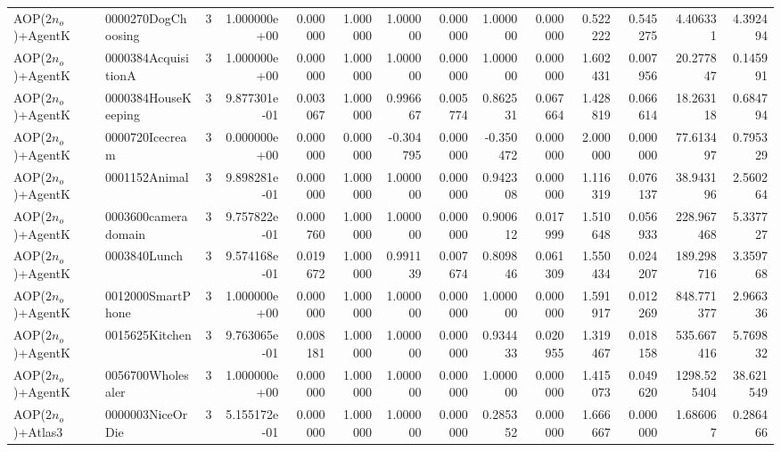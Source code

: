 \begin{tabular}{llrr|r|rr|rr|rr|rrr}
      AOP($2 n_o$)+AgentK &     0000270DogChoosing &       3 & 1.000000e+00 & 0.000000 & 1.000000 &      1.000000 & 0.000000 &      1.000000 & 0.000000 &      0.522222 &    0.545275 &     4.406331 &    4.392494 \\
      AOP($2 n_o$)+AgentK &    0000384AcquisitionA &       3 & 1.000000e+00 & 0.000000 & 1.000000 &      1.000000 & 0.000000 &      1.000000 & 0.000000 &      1.602431 &    0.007956 &    20.277847 &    0.145991 \\
      AOP($2 n_o$)+AgentK &    0000384HouseKeeping &       3 & 9.877301e-01 & 0.003067 & 1.000000 &      0.996667 & 0.005774 &      0.862531 & 0.067664 &      1.428819 &    0.066614 &    18.263118 &    0.684794 \\
      AOP($2 n_o$)+AgentK &        0000720Icecream &       3 & 0.000000e+00 & 0.000000 & 0.000000 &     -0.304795 & 0.000000 &     -0.350472 & 0.000000 &      2.000000 &    0.000000 &    77.613497 &    0.795329 \\
      AOP($2 n_o$)+AgentK &          0001152Animal &       3 & 9.898281e-01 & 0.000000 & 1.000000 &      1.000000 & 0.000000 &      0.942308 & 0.000000 &      1.116319 &    0.076137 &    38.943196 &    2.560264 \\
      AOP($2 n_o$)+AgentK &    0003600cameradomain &       3 & 9.757822e-01 & 0.000760 & 1.000000 &      1.000000 & 0.000000 &      0.900612 & 0.017999 &      1.510648 &    0.056933 &   228.967468 &    5.337727 \\
      AOP($2 n_o$)+AgentK &           0003840Lunch &       3 & 9.574168e-01 & 0.019672 & 1.000000 &      0.991139 & 0.007674 &      0.809846 & 0.061309 &      1.550434 &    0.024207 &   189.298716 &    3.359768 \\
      AOP($2 n_o$)+AgentK &      0012000SmartPhone &       3 & 1.000000e+00 & 0.000000 & 1.000000 &      1.000000 & 0.000000 &      1.000000 & 0.000000 &      1.591917 &    0.012269 &   848.771377 &    2.966336 \\
      AOP($2 n_o$)+AgentK &         0015625Kitchen &       3 & 9.763065e-01 & 0.008181 & 1.000000 &      1.000000 & 0.000000 &      0.934433 & 0.020955 &      1.319467 &    0.018158 &   535.667416 &    5.769832 \\
      AOP($2 n_o$)+AgentK &      0056700Wholesaler &       3 & 1.000000e+00 & 0.000000 & 1.000000 &      1.000000 & 0.000000 &      1.000000 & 0.000000 &      1.415073 &    0.049620 &  1298.525404 &   38.621549 \\
      AOP($2 n_o$)+Atlas3 &       0000003NiceOrDie &       3 & 5.155172e-01 & 0.000000 & 1.000000 &      1.000000 & 0.000000 &      0.285352 & 0.000000 &      1.666667 &    0.000000 &     1.686067 &    0.286466 \\

\end{tabular}
